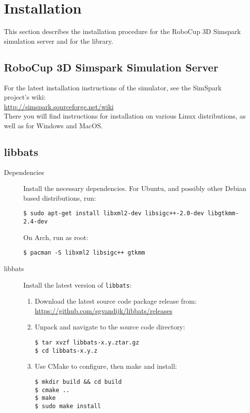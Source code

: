 \chapter{Installation}
\label{chInstallation}

This section describes the installation procedure for the RoboCup 3D
Simspark simulation server and for the \libbats library.

\section{RoboCup 3D Simspark Simulation Server}

For the latest installation instructions of the simulator, see the SimSpark project's wiki: \\
\url{http://simspark.sourceforge.net/wiki}\\
There you will find instructions for installation on various Linux
distributions, as well as for Windows and MacOS.

\section{libbats}

\begin{description}
\item[Dependencies] Install the necessary dependencies. For Ubuntu,
  and possibly other Debian based distributions, run:
\begin{verbatim}
$ sudo apt-get install libxml2-dev libsigc++-2.0-dev libgtkmm-2.4-dev
\end{verbatim}
  On Arch, run as root:
\begin{verbatim}
$ pacman -S libxml2 libsigc++ gtkmm
\end{verbatim}
\item[libbats] Install the latest version of {\tt libbats}:
  \begin{enumerate}
  \item Download the latest source code package release from: \\
    \url{https://github.com/sgvandijk/libbats/releases}
  \item Unpack and navigate to the source code directory:
\begin{verbatim}
$ tar xvzf libbats-x.y.ztar.gz
$ cd libbats-x.y.z
\end{verbatim}
  \item Use CMake to configure, then make and install:
\begin{verbatim}
$ mkdir build && cd build
$ cmake ..
$ make
$ sudo make install
\end{verbatim}
  \end{enumerate}
\end{description}

